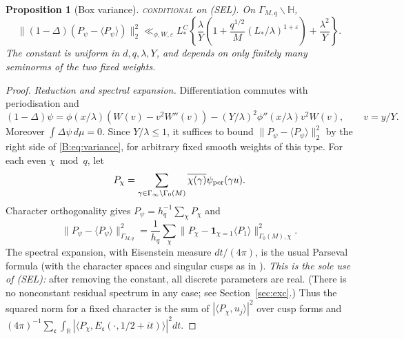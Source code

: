 \documentclass[10pt,reqno]{amsart}
\newtheorem{proposition}[theorem]{Proposition}
\theoremstyle{definition}
\numberwithin{equation}{section}
\newcommand{\R}{\mathbb R}
\newcommand{\HH}{\mathbb H}
\newcommand{\ind}{\mathbf 1}
\newcommand{\status}[1]{\textup{\textsc{#1}}}
\begin{document}
\begin{proposition}[Box variance]\label{L:5.1}
\status{conditional} on (SEL). On \(\Gamma_{M,q}\backslash\HH\),
\begin{equation}\label{B:eq:variance}
 \|(1-\Delta)(P_\psi-\langle P_\psi\rangle)\|_2^2
 \ll_{\phi,W,\varepsilon}L_*^C
 \left\{\frac\lambda Y
   \left(1+\frac{q^{1/2}}M(L_*/\lambda)^{1+\varepsilon}\right)
       +\frac{\lambda^2}Y\right\}.
\end{equation}
The constant is uniform in \(d,q,\lambda,Y\), and depends on only finitely
many seminorms of the two fixed weights.
\end{proposition}
\begin{proof}
\emph{Reduction and spectral expansion.}
Differentiation commutes with periodisation and
\[
 (1-\Delta)\psi
 =\phi(x/\lambda)(W(v)-v^2W''(v))
       -(Y/\lambda)^2\phi''(x/\lambda)v^2W(v),\qquad v=y/Y.
\]
Moreover \(\int\Delta\psi\,d\mu=0\). Since \(Y/\lambda\le1\), it suffices
to bound \(\|P_\psi-\langle P_\psi\rangle\|_2^2\) by the right side of
\eqref{B:eq:variance}, for arbitrary fixed smooth weights of this type.
For each even \(\chi\bmod q\), let
\[
 P_\chi=\sum_{\gamma\in\Gamma_\infty\backslash\Gamma_0(M)}
            \overline{\chi(\gamma)}\psi_{\rm per}(\gamma u).
\]
Character orthogonality gives \(P_\psi=h_q^{-1}\sum_\chi P_\chi\) and
\begin{equation}\label{B:eq:char-norm}
 \|P_\psi-\langle P_\psi\rangle\|_{\Gamma_{M,q}}^2
 =\frac1{h_q}\sum_\chi
       \|P_\chi-\ind_{\chi=1}\langle P_1\rangle\|_{\Gamma_0(M),\chi}^2.
\end{equation}
The spectral expansion, with Eisenstein measure \(dt/(4\pi)\), is the
usual Parseval formula \cite[Theorem 7.3]{Iw} (with the character
spaces and singular cusps as in \cite[\S4.1]{Dr}).
\emph{This is the sole use of (SEL):} after removing the constant,
all discrete parameters are real. (There is no nonconstant residual
spectrum in any case; see Section~\ref{sec:exc}.) Thus the squared norm for a fixed character is the sum of
\(|\langle P_\chi,u_j\rangle|^2\) over cusp forms and
\((4\pi)^{-1}\sum_{\mathfrak c}\int_\R
|\langle P_\chi,E_{\mathfrak c}(\cdot,1/2+it)\rangle|^2dt\).


\end{proof}
\end{document}
